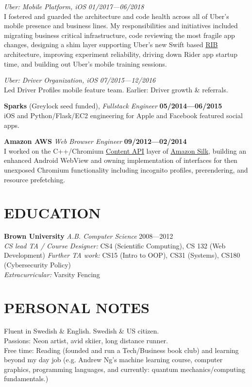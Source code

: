 \documentclass[line,margin]{res}
\begin{document}
\begin{resume}
    {\sl Uber: Mobile Platform, iOS} \hfill {\sl01/2017—06/2018} \\ 
    I fostered and guarded the architecture and code health across all of Uber's mobile presence and business lines.
    My responsibilities and initiatives included migrating business critical infrastructure, code reviewing the most fragile app changes, designing a shim layer supporting Uber's new Swift based \href{https://github.com/uber/RIBs}{RIB} architecture, improving experiment reliability, driving down Rider app startup time, and building out Uber's mobile training sessions.

    {\sl Uber: Driver Organization, iOS} \hfill {\sl07/2015—12/2016} \\
    Led Driver Profiles mobile feature team. Earlier: Driver growth \& referrals.

    \textbf{Sparks} (Greylock seed funded), {\sl Fullstack Engineer} \hfill \textbf{05/2014—06/2015} \\
    iOS and Python/Flask/EC2 engineering for Apple and Facebook featured social apps.

    \textbf{Amazon AWS} {\sl Web Browser Engineer} \hfill \textbf{09/2012—02/2014} \\
    I worked on the C++/Chromium \href{https://chromium.googlesource.com/chromium/src/+/HEAD/content/public/README.md}{Content API} layer of \href{https://en.wikipedia.org/wiki/Amazon_Silk}{Amazon Silk}, building an enhanced Android WebView and owning implementation of interfaces for then unexposed Chromium functionality including incognito profiles, prerendering, and resource prefetching.

\section{EDUCATION}
    \textbf{Brown University} {\sl A.B. Computer Science} \hfill 2008—2012 \\
    {\sl CS lead TA / Course Designer:} CS4 (Scientific Computing), CS 132 (Web Development)
    {\sl Further TA work:} CS15 (Intro to OOP), CS31 (Systems), CS180 (Cybersecurity Policy)\\
    {\sl Extracurricular:} Varsity Fencing

\section{PERSONAL NOTES}
    Fluent in Swedish \& English. Swedish \& US citizen.\\
    Passions: Neon artist, avid skiier, long distance runner. \\
    Free time: Reading (founded and run a Tech/Business book club) and learning beyond my day job (e.g. Andrew Ng's machine learning course, computer graphics, programming languages, and currently: quantum mechanics/computing fundamentals.)

\end{resume}
\end{document}
